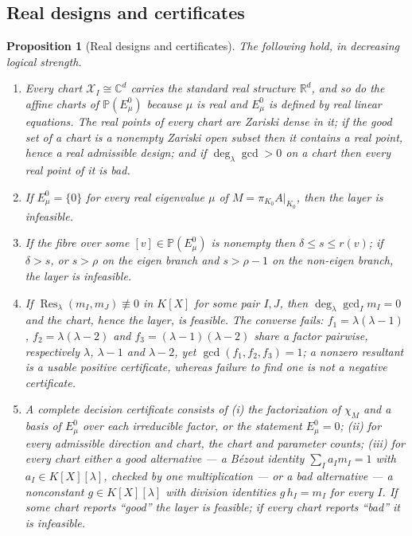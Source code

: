\documentclass[journal]{IEEEtran}
\theoremstyle{plainn}
\newtheorem{prop}[thm]{Proposition}
\theoremstyle{remark}
\begin{document}
\subsection{Real designs and certificates}
\label{sec4:real}\label{sec4:certificates}

\begin{prop}[Real designs and certificates]
\label{sec4:prop:realpoints}
\label{sec4:prop:sieve}
\label{sec4:prop:dimineq}
\label{sec4:prop:resultant}
\label{sec4:prop:cert}
The following hold, in decreasing logical strength.
\begin{enumerate}[label=(\alph*),leftmargin=*]
\item \label{it:real} Every chart $\mathcal X_I\cong\mathbb C^d$ carries the standard real structure
$\mathbb R^d$, and so do the affine charts of $\mathbb P(E_\mu^0)$ because $\mu$ is real and $E_\mu^0$
is defined by real linear equations. The real points of every chart are Zariski dense in it; if the
good set of a chart is a nonempty Zariski open subset then it contains a real point, hence a real
admissible design; and if $\deg_\lambda\gcd>0$ on a chart then every real point of it is bad.
\item \label{it:sieve} If $E_\mu^0=\{0\}$ for every real eigenvalue $\mu$ of
$M=\pi_{K_0}A|_{K_0}$, then the layer is infeasible.
\item \label{it:dimineq} If the fibre over some $[v]\in\mathbb P(E_\mu^0)$ is nonempty then
$\delta\le s\le r(v)$; if $\delta>s$, or $s>\rho$ on the eigen branch and $s>\rho-1$ on the non-eigen
branch, the layer is infeasible.
\item \label{it:resultant} If $\operatorname{Res}_\lambda(m_I,m_J)\not\equiv0$ in $K[X]$ for some pair
$I,J$, then $\deg_\lambda\gcd_I m_I=0$ and the chart, hence the layer, is feasible. The converse fails:
$f_1=\lambda(\lambda-1)$, $f_2=\lambda(\lambda-2)$ and $f_3=(\lambda-1)(\lambda-2)$ share a factor
pairwise, respectively $\lambda$, $\lambda-1$ and $\lambda-2$, yet $\gcd(f_1,f_2,f_3)=1$; a nonzero
resultant is a usable positive certificate, whereas failure to find one is not a negative certificate.
\item \label{it:cert} A complete decision certificate consists of (i) the factorization of $\chi_M$ and
a basis of $E_\mu^0$ over each irreducible factor, or the statement $E_\mu^0=0$; (ii) for every
admissible direction and chart, the chart and parameter counts; (iii) for every chart either a
\emph{good} alternative --- a Bézout identity $\sum_I a_I m_I=1$ with $a_I\in K[X][\lambda]$, checked
by one multiplication --- or a \emph{bad} alternative --- a nonconstant $g\in K[X][\lambda]$ with
division identities $g\,h_I=m_I$ for every $I$. If some chart reports ``good'' the layer is feasible;
if every chart reports ``bad'' it is infeasible.
\end{enumerate}
\end{prop}
\end{document}
